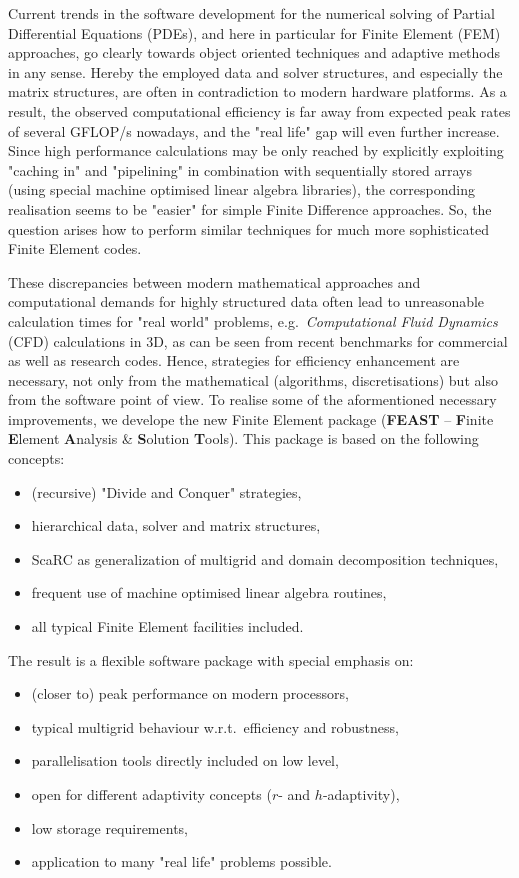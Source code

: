 
Current trends in the software development for the numerical solving of Partial Differential Equations (PDEs), 
and here in particular for Finite Element (FEM) approaches, 
go clearly towards object oriented techniques and adaptive methods in any sense. 
Hereby the employed data and solver structures, and especially the matrix structures, are often in contradiction to modern hardware platforms. As a result, the observed computational efficiency is far 
away from expected peak rates of several GFLOP/s nowadays, and the "real life" gap will even further 
increase. Since high performance calculations 
may be only reached by explicitly 
exploiting "caching in" and "pipelining" in combination with sequentially stored
arrays (using special machine optimised linear algebra libraries), the corresponding 
realisation seems to be "easier" for simple Finite Difference approaches. So, the question arises 
how to perform similar techniques for much more sophisticated Finite Element codes.

These discrepancies between modern mathematical approaches and computational 
demands for highly structured data often lead to unreasonable calculation times for "real world" problems, 
e.g.\ {\em Computational Fluid Dynamics} (CFD) calculations in 3D, as can be seen from recent benchmarks
\cite{TurekSchaeferRannacher1998} for commercial as well as research codes. Hence, strategies for efficiency enhancement
are necessary, not only from the mathematical (algorithms, discretisations) 
but also from the software point of view.
To realise some of the aformentioned necessary improvements, we develope the new Finite Element package 
({\bf FEAST} 
-- {\bf F}inite {\bf E}lement {\bf A}nalysis \& {\bf S}olution {\bf T}ools). 
This package is based on the following concepts:

\begin{itemize}
\item (recursive) "Divide and Conquer" strategies,
\item hierarchical data, solver and matrix structures,
\item {\sc ScaRC} as generalization of multigrid and domain decomposition techniques,
\item frequent use of machine optimised linear algebra routines, 
\item all typical Finite Element facilities included.
\end{itemize}
%
%
The result is a flexible software package with special emphasis on:
%
\begin{itemize}
\item (closer to) peak performance on modern processors,
\item typical multigrid behaviour w.r.t.\ efficiency and robustness,
\item parallelisation tools directly included on low level,
\item open for different adaptivity concepts ($r$- and $h$-adaptivity),
\item low storage requirements, 
\item application to many "real life" problems possible.
\end{itemize}

